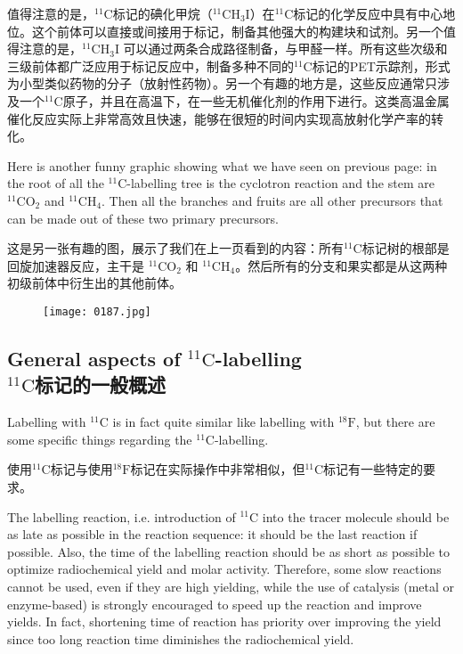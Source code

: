 \documentclass[dvipsnames, svgnames,a4paper,11pt]{article}
\begin{document}
值得注意的是，${}^\mathrm{11}\mathrm{C}$标记的碘化甲烷（$\mathrm{^{11}CH_3I}$）在${}^\mathrm{11}\mathrm{C}$标记的化学反应中具有中心地位。这个前体可以直接或间接用于标记，制备其他强大的构建块和试剂。另一个值得注意的是，$\mathrm{^{11}CH_3I}$ 可以通过两条合成路径制备，与甲醛一样。所有这些次级和三级前体都广泛应用于标记反应中，制备多种不同的${}^\mathrm{11}\mathrm{C}$标记的PET示踪剂，形式为小型类似药物的分子（放射性药物）。另一个有趣的地方是，这些反应通常只涉及一个${}^\mathrm{11}\mathrm{C}$原子，并且在高温下，在一些无机催化剂的作用下进行。这类高温金属催化反应实际上非常高效且快速，能够在很短的时间内实现高放射化学产率的转化。

Here is another funny graphic showing what we have seen on previous page: in the root of all the ${}^\mathrm{11}\mathrm{C}$-labelling tree is the cyclotron reaction and the stem are ${}^\mathrm{11}\mathrm{CO_2}$ and ${}^\mathrm{11}\mathrm{CH_4}$. Then all the branches and fruits are all other precursors that can be made out of these two primary precursors.

这是另一张有趣的图，展示了我们在上一页看到的内容：所有${}^\mathrm{11}\mathrm{C}$标记树的根部是回旋加速器反应，主干是 $\mathrm{^{11}CO_2}$ 和 $\mathrm{^{11}CH_4}$。然后所有的分支和果实都是从这两种初级前体中衍生出的其他前体。


\begin{figure}[h]
	\centering
    \texttt{[image: 0187.jpg]}  
     \label{fig217}
\end{figure}

\subsection{General aspects of ${}^\mathrm{11}\mathrm{C}$-labelling \\${}^\mathrm{11}\mathrm{C}$标记的一般概述}

Labelling with ${}^\mathrm{11}\mathrm{C}$ is in fact quite similar like labelling with ${}^\mathrm{18}\mathrm{F}$, but there are some specific things regarding the ${}^\mathrm{11}\mathrm{C}$-labelling.

使用${}^\mathrm{11}\mathrm{C}$标记与使用${}^\mathrm{18}\mathrm{F}$标记在实际操作中非常相似，但${}^\mathrm{11}\mathrm{C}$标记有一些特定的要求。

The labelling reaction, i.e. introduction of ${}^\mathrm{11}\mathrm{C}$ into the tracer molecule should be as late as possible in the reaction sequence: it should be the last reaction if possible. Also, the time of the labelling reaction should be as short as possible to optimize radiochemical yield and molar activity. Therefore, some slow reactions cannot be used, even if they are high yielding, while the use of catalysis (metal or enzyme-based) is strongly encouraged to speed up the reaction and improve yields. In fact, shortening time of reaction has priority over improving the yield since too long reaction time diminishes the radiochemical yield.
\end{document}
